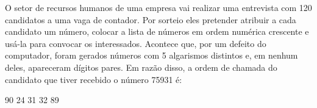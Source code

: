 O setor de recursos humanos de uma empresa vai realizar uma entrevista com 120 candidatos a uma vaga de contador. Por sorteio eles pretender atribuir a cada candidato um número, colocar a lista de números em ordem numérica crescente e usá-la para convocar os interessados. Acontece que, por um defeito do computador, foram gerados números com 5 algarismos distintos e, em nenhum deles, apareceram dígitos pares. Em razão disso, a ordem de chamada do candidato que tiver recebido o número 75931 é:

90
24
31
32
89




